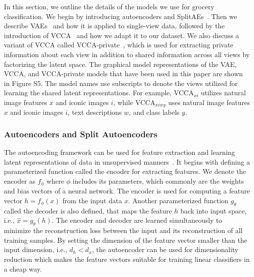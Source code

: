 In this section, we outline the details of the models we use for grocery classification.
We begin by introducing autoencoders and SplitAEs~. Then we describe VAEs~ and how it is applied to single-view data, followed by the introduction of VCCA~ and how we adapt it to our dataset. We also discuss a variant of VCCA called VCCA-private~, which is used for extracting private information about each view in addition to shared information across all views by factorizing the latent space. The graphical model representations of the VAE, VCCA, and VCCA-private models that have been used in this paper are shown in Figure S5. The model names use subscripts to denote the views utilized for learning the shared latent representations. For example, VCCA$_{x i}$ utilizes natural image features $x$ and iconic images $i$, while VCCA$_{x i w y}$ uses natural image features $x$ and iconic images $i$, text descriptions $w$, and class labels $y$.

\subsubsection{Autoencoders and Split Autoencoders}
\label{paperB:sec:autoencoders_and_split_autoencoders}

The autoencoding framework can be used for feature extraction and learning latent representations of data in unsupervised manners~. It begins with defining a parameterized function called the encoder for extracting features. We denote the encoder as $f_{\phi}$ where $\phi$ includes its parameters, which commonly are the weights and bias vectors of a neural network. The encoder is used for computing a feature vector $h = f_{\phi}(x)$ from the input data $x$. Another parameterized function $g_{\theta}$ called the decoder is also defined, that maps the feature $h$ back into input space, i.e., $\hat{x} = g_{\theta}(h)$. The encoder and decoder are learned simultaneously to minimize the reconstruction loss between the input and its reconstruction of all training samples. By setting the dimension of the feature vector smaller than the input dimension, i.e., $d_{h} < d_{x}$, the autoencoder can be used for dimensionality reduction which makes the feature vectors suitable for training linear classifiers in a cheap way.

